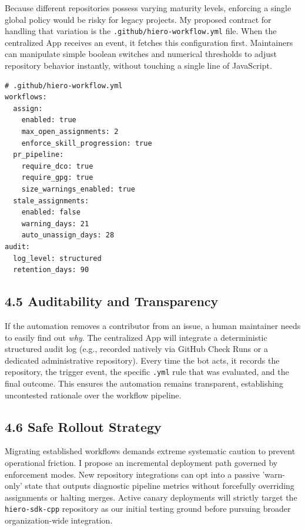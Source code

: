 \documentclass[11pt]{article}
\begin{document}
Because different repositories possess varying maturity levels, enforcing a single global policy would be risky for legacy projects. My proposed contract for handling that variation is the \texttt{.github/hiero-workflow.yml} file.
When the centralized App receives an event, it fetches this configuration first. Maintainers can manipulate simple boolean switches and numerical thresholds to adjust repository behavior instantly, without touching a single line of JavaScript.

\begin{verbatim}
# .github/hiero-workflow.yml
workflows:
  assign:
    enabled: true
    max_open_assignments: 2
    enforce_skill_progression: true
  pr_pipeline:
    require_dco: true
    require_gpg: true
    size_warnings_enabled: true
  stale_assignments:
    enabled: false
    warning_days: 21
    auto_unassign_days: 28
audit:
  log_level: structured
  retention_days: 90
\end{verbatim}

\subsection*{4.5 Auditability and Transparency}

If the automation removes a contributor from an issue, a human maintainer needs to easily find out \textit{why}. The centralized App will integrate a deterministic structured audit log (e.g., recorded natively via GitHub Check Runs or a dedicated administrative repository). Every time the bot acts, it records the repository, the trigger event, the specific \texttt{.yml} rule that was evaluated, and the final outcome. This ensures the automation remains transparent, establishing uncontested rationale over the workflow pipeline.

\subsection*{4.6 Safe Rollout Strategy}

Migrating established workflows demands extreme systematic caution to prevent operational friction. I propose an incremental deployment path governed by enforcement modes. New repository integrations can opt into a passive 'warn-only' state that outputs diagnostic pipeline metrics without forcefully overriding assignments or halting merges. Active canary deployments will strictly target the \texttt{hiero-sdk-cpp} repository as our initial testing ground before pursuing broader organization-wide integration.
\end{document}

